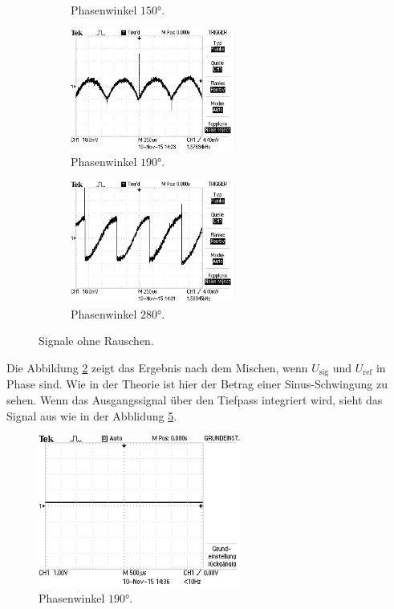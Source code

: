 \begin{figure}
\begin{subfigure}{0.48\textwidth}
    \caption{Phasenwinkel $150°$.}
    \label{fig:orp150}
  \end{subfigure}
  \begin{subfigure}{0.48\textwidth}
    \centering
    \includegraphics[height=4cm]{Bilder/or/or190.JPG}
    \caption{Phasenwinkel $190°$.}
    \label{fig:orp190}
  \end{subfigure}
  \begin{subfigure}{0.48\textwidth}
    \centering
    \includegraphics[height=4cm]{Bilder/or/or280.JPG}
    \caption{Phasenwinkel $280°$.}
    \label{fig:orp280}
  \end{subfigure}
  \caption{Signale ohne Rauschen.}
  \label{fig:Signale ohne Rauschen}
\end{figure}
Die Abbildung \ref{fig:orp190} zeigt das Ergebnis nach dem Mischen, wenn $U_\text{sig}$
und $U_\text{ref}$ in Phase sind. Wie in der Theorie ist hier der Betrag einer Sinus-Schwingung
zu sehen. Wenn das Ausgangssignal über den Tiefpass integriert wird, sieht das
Signal aus wie in der Abblidung \ref{fig:int}.
\begin{figure}
  \centering
  \includegraphics[height=5cm]{Bilder/int/INT.JPG}
  \caption{Phasenwinkel $190°$.}
  \label{fig:int}
\end{figure}
